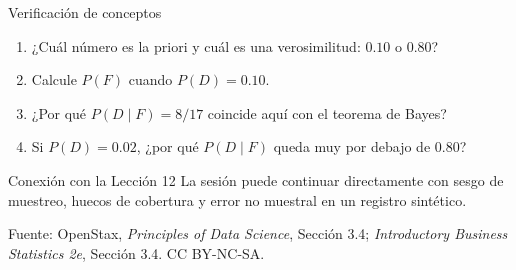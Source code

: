 \documentclass[aspectratio=169,10pt,spanish]{beamer}
\begin{document}
\begin{frame}{Verificación de conceptos}
  \begin{enumerate}
    \item ¿Cuál número es la priori y cuál es una verosimilitud: $0.10$ o
      $0.80$?
    \item Calcule $P(F)$ cuando $P(D)=0.10$.
    \item ¿Por qué $P(D\mid F)=8/17$ coincide aquí con el teorema de Bayes?
    \item Si $P(D)=0.02$, ¿por qué $P(D\mid F)$ queda muy por debajo de
      $0.80$?
  \end{enumerate}

  \vspace{0.6em}
  \begin{block}{Conexión con la Lección 12}
    La sesión puede continuar directamente con sesgo de muestreo, huecos de
    cobertura y error no muestral en un registro sintético.
  \end{block}

  \vfill
  \scriptsize Fuente: OpenStax, \textit{Principles of Data Science},
  Sección 3.4; \textit{Introductory Business Statistics 2e}, Sección 3.4.
  CC BY-NC-SA.
\end{frame}

\appendix
\end{document}
